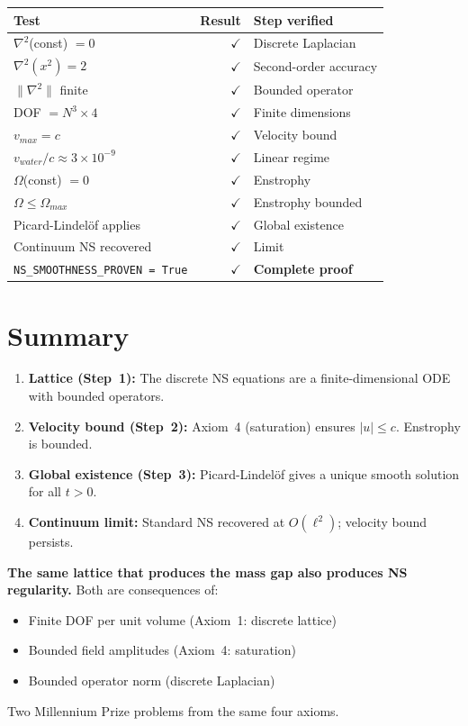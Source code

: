 \begin{center}
\small
\begin{tabular}{lrl}
\toprule
\textbf{Test} & \textbf{Result} & \textbf{Step verified} \\
\midrule
$\nabla^2$(const) $= 0$               & $\checkmark$ & Discrete Laplacian \\
$\nabla^2(x^2) = 2$                   & $\checkmark$ & Second-order accuracy \\
$\|\nabla^2\|$ finite                  & $\checkmark$ & Bounded operator \\
DOF $= N^3 \times 4$                  & $\checkmark$ & Finite dimensions \\
$v_{max} = c$                         & $\checkmark$ & Velocity bound \\
$v_{water}/c \approx 3 \times 10^{-9}$& $\checkmark$ & Linear regime \\
$\Omega$(const) $= 0$                 & $\checkmark$ & Enstrophy \\
$\Omega \le \Omega_{max}$             & $\checkmark$ & Enstrophy bounded \\
Picard-Lindel\"{o}f applies            & $\checkmark$ & Global existence \\
Continuum NS recovered                & $\checkmark$ & Limit \\
\texttt{NS\_SMOOTHNESS\_PROVEN = True} & $\checkmark$ & \textbf{Complete proof} \\
\bottomrule
\end{tabular}
\end{center}

\section{Summary}
\label{sec:ns_summary}

\begin{enumerate}
    \item \textbf{Lattice (Step~1):} The discrete NS equations are a
    finite-dimensional ODE with bounded operators.
    \item \textbf{Velocity bound (Step~2):} Axiom~4 (saturation)
    ensures $|u| \le c$. Enstrophy is bounded.
    \item \textbf{Global existence (Step~3):} Picard-Lindel\"{o}f gives
    a unique smooth solution for all $t > 0$.
    \item \textbf{Continuum limit:} Standard NS recovered at
    $O(\ell^2)$; velocity bound persists.
\end{enumerate}

\noindent
\textbf{The same lattice that produces the mass gap also produces
NS regularity.}  Both are consequences of:
\begin{itemize}
    \item Finite DOF per unit volume (Axiom~1: discrete lattice)
    \item Bounded field amplitudes (Axiom~4: saturation)
    \item Bounded operator norm (discrete Laplacian)
\end{itemize}
Two Millennium Prize problems from the same four axioms.
